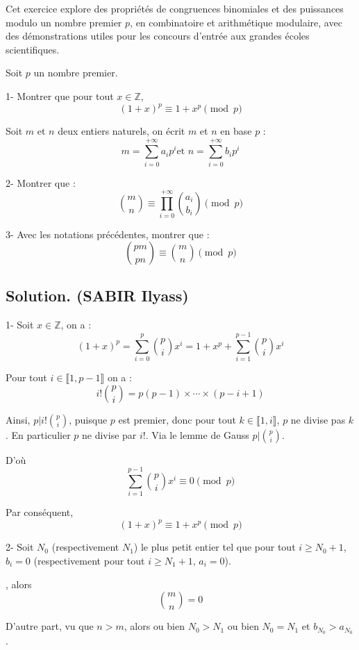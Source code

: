 Cet exercice explore des propri{\'e}t{\'e}s de congruences binomiales et des
puissances modulo un nombre premier $p$, en combinatoire et arithm{\'e}tique
modulaire, avec des d{\'e}monstrations utiles pour les concours d'entr{\'e}e
aux grandes {\'e}coles scientifiques.
\begin{exercise}
Soit $p$ un nombre premier.

1- Montrer que pour tout $x \in \mathbb{Z}$,
\[ (1 + x)^p \equiv 1 + x^p \pmod{p} \]


Soit $m$ et $n$ deux entiers naturels, on {\'e}crit $m$ et $n$ en base $p$ :
\[ m = \sum_{i = 0}^{+ \infty} a_i p^i  \text{et } n = \sum_{i = 0}^{+ \infty}
   b_i p^i \]


2- Montrer que :
\[ \binom{m}{n} \equiv \prod_{i = 0}^{+ \infty} \binom{a_i}{b_i} \pmod{p} \]


3- Avec les notations pr{\'e}c{\'e}dentes, montrer que :
\[ \binom{pm}{pn} \equiv \binom{m}{n} \pmod{p} \]

\end{exercise}

\subsection*{Solution. (SABIR Ilyass)}

1- Soit $x \in \mathbb{Z}$, on a :
\[ (1 + x)^p = \sum_{i = 0}^p \binom{p}{i} x^i = 1 + x^p + \sum_{i = 1}^{p -
   1} \binom{p}{i} x^i \]


Pour tout $i \in \llbracket 1, p - 1 \rrbracket$ on a :
\[ i! \binom{p}{i} = p (p - 1) \times \cdots \times (p - i + 1) \]


Ainsi, $p|i! \binom{p}{i}$, puisque $p$ est premier, donc pour tout $k \in
\llbracket 1, i \rrbracket$, $p$ ne divise pas $k$. En particulier $p$ ne
divise par $i$!. Via le lemme de Gauss $p| \binom{p}{i}$.

D'o{\`u}
\[ \sum_{i = 1}^{p - 1} \binom{p}{i} x^i \equiv 0 \pmod{p} \]


Par cons{\'e}quent,
\[ (1 + x)^p \equiv 1 + x^p \pmod{p} \]


2- Soit $N_0$ (respectivement $N_1$) le plus petit entier tel que pour tout $i
\geqslant N_0 + 1$, $b_i = 0$ (respectivement pour tout $i \geqslant N_1 + 1$,
$a_i = 0$).

, alors
\[ \binom{m}{n} = 0 \]


D'autre part, vu que $n > m$, alors ou bien $N_0 > N_1$ ou bien $N_0 = N_1$ et
$b_{N_0} > a_{N_0}$.

